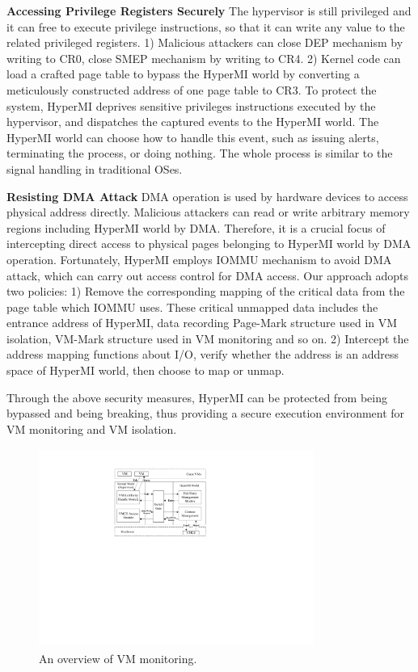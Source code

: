 \documentclass[conference]{IEEEtran}
\begin{document}
\fi

\textbf{Accessing Privilege Registers Securely}
The hypervisor is still privileged and it can free to execute privilege instructions, so that it can write any value to the related privileged registers. 1) Malicious attackers can close DEP mechanism by writing to CR0, close SMEP mechanism by writing to CR4. 2) Kernel code can load a crafted page table to bypass the HyperMI world by converting a meticulously constructed address of one page table to CR3.
To protect the system, HyperMI deprives sensitive privileges instructions executed by the hypervisor, and dispatches the captured events to the HyperMI world. The HyperMI world can choose how to handle this event, such as issuing alerts, terminating the process, or doing nothing. The whole process is similar to the signal handling in traditional OSes.

\textbf{Resisting DMA Attack}
DMA operation is used by hardware devices to access physical address directly. Malicious attackers can read or write arbitrary memory regions including HyperMI world by DMA. Therefore, it is a crucial focus of intercepting direct access to physical pages belonging to HyperMI world by DMA operation. 
Fortunately, HyperMI employs IOMMU mechanism to avoid DMA attack, which can carry out access control for DMA access. Our approach adopts two policies: 1) Remove the corresponding mapping of the critical data from the page table which IOMMU uses. These critical unmapped data includes the entrance address of HyperMI, data recording Page-Mark structure used in VM isolation, VM-Mark structure used in VM monitoring and so on. 2) Intercept the address mapping functions about I/O, verify whether the address is an address space of HyperMI world, then choose to map or unmap.


Through the above security measures, HyperMI can be protected from being bypassed and being breaking, thus providing a secure execution environment for VM monitoring and VM isolation.














\iffalse
\begin{figure}
\centerline{\includegraphics[width=9cm,height=6.5cm]{pdfvmcs4.pdf}}%
\caption{An overview of VM monitoring.} \label{fig4}
\end{figure}
\end{document}
